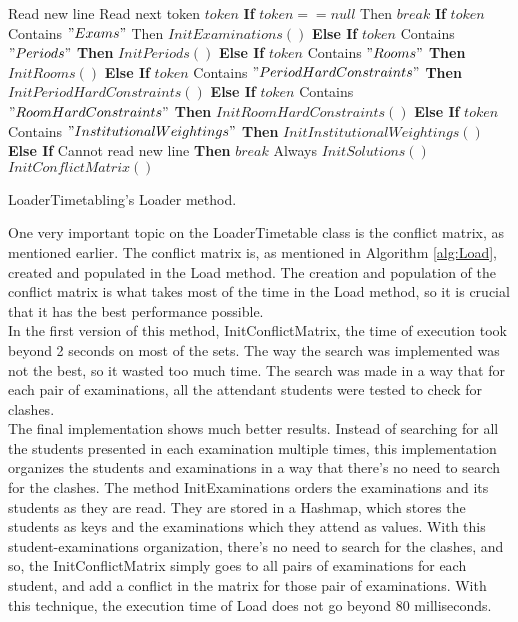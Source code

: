 \begin{algorithm}
\begin{algorithmic}[1]
\State Read new line
\Repeat
	\State Read next token $token$
	\State \textbf{If} $token == null$ Then $break$ 
	\State \textbf{If} $token$ Contains $"Exams"$ Then $InitExaminations()$
	\State \textbf{Else If} $token$ Contains $"Periods"$ \textbf{Then} $InitPeriods()$
	\State \textbf{Else If} $token$ Contains $"Rooms"$ \textbf{Then} $InitRooms()$
	\State \textbf{Else If} $token$ Contains $"PeriodHardConstraints"$ \textbf{Then} $InitPeriodHardConstraints()$
	\State \textbf{Else If} $token$ Contains $"RoomHardConstraints"$ \textbf{Then} $InitRoomHardConstraints()$
	\State \textbf{Else If} $token$ Contains $"InstitutionalWeightings"$ \textbf{Then} $InitInstitutionalWeightings()$
	\State \textbf{Else If} Cannot read new line \textbf{Then} $break$ 
\Until Always
\State $InitSolutions()$
\State $InitConflictMatrix()$
\end{algorithmic}
\caption{LoaderTimetabling's Loader method.}
\label{alg:Load}
\end{algorithm}

One very important topic on the LoaderTimetable class is the conflict matrix, as mentioned earlier. The conflict matrix is, as mentioned in Algorithm \ref{alg:Load}, created and populated in the Load method. The creation and population of the conflict matrix is what takes most of the time in the Load method, so it is crucial that it has the best performance possible.\\

In the first version of this method, InitConflictMatrix, the time of execution took beyond 2 seconds on most of the sets. The way the search was implemented was not the best, so it wasted too much time. The search was made in a way that for each pair of examinations, all the attendant students were tested to check for clashes.\\

The final implementation shows much better results. Instead of searching for all the students presented in each examination multiple times, this implementation organizes the students and examinations in a way that there's no need to search for the clashes. The method InitExaminations orders the examinations and its students as they are read. They are stored in a Hashmap, which stores the students as keys and the examinations which they attend as values. With this student-examinations organization, there's no need to search for the clashes, and so, the InitConflictMatrix simply goes to all pairs of examinations for each student, and add a conflict in the matrix for those pair of examinations. With this technique, the execution time of Load does not go beyond 80 milliseconds.

